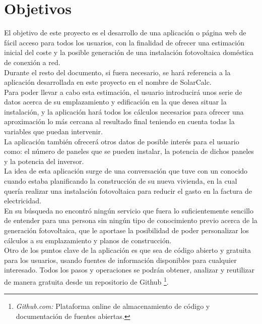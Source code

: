 \section{Objetivos}
El objetivo de este proyecto es el desarrollo de una aplicación o página web de fácil acceso para todos los usuarios, con la finalidad de ofrecer una estimación inicial del coste y la posible generación de una instalación fotovoltaica doméstica de conexión a red.\\

Durante el resto del documento, si fuera necesario, se hará referencia a la aplicación desarrollada en este proyecto en el nombre de SolarCalc.\\

Para poder llevar a cabo esta estimación, el usuario introducirá unos serie de datos acerca de su emplazamiento y edificación en la que desea situar la instalación, y la aplicación hará todos los cálculos necesarios para ofrecer una aproximación lo más cercana al resultado final teniendo en cuenta todas la variables que puedan intervenir.\\

La aplicación también ofrecerá otros datos de posible interés para el usuario como: el número de paneles que se pueden instalar, la potencia de dichos paneles y la potencia del inversor.\\

La idea de esta aplicación surge de una conversación que tuve con un conocido cuando estaba planificando la construcción de su nueva vivienda, en la cual quería realizar una instalación fotovoltaica para reducir el gasto en la factura de electricidad.\\

En su búsqueda no encontró ningún servicio que fuera lo suficientemente sencillo de entender para una persona sin ningún tipo de conocimiento previo acerca de la generación fotovoltaica, que le aportase la posibilidad de poder personalizar los cálculos a su emplazamiento y planos de construcción.\\

Otro de los puntos clave de la aplicación es que sea de código abierto y gratuita para los usuarios, usando fuentes de información disponibles para cualquier interesado. Todos los pasos y operaciones se podrán obtener, analizar y reutilizar de manera gratuita desde un repositorio de Github \footnote{\textit{Github.com:} Plataforma online de almacenamiento de código y documentación de fuentes abiertas.}.\\


